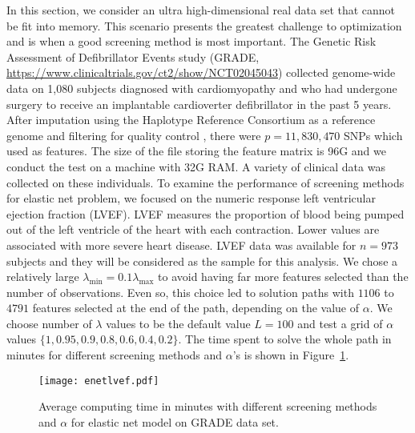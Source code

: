 In this section, we consider an ultra high-dimensional real data set that cannot be fit into memory. This scenario presents the greatest challenge to optimization and is when a good screening method is most important. The Genetic Risk Assessment of Defibrillator Events study (GRADE, \url{https://www.clinicaltrials.gov/ct2/show/NCT02045043}) collected genome-wide data on 1,080 subjects diagnosed with cardiomyopathy and who had undergone surgery to receive an implantable cardioverter defibrillator in the past 5 years. After imputation using the Haplotype Reference Consortium as a reference genome and filtering for quality control \citep{Das2016}, there were $p=11,830,470$ SNPs which used as features. The size of the file storing the feature matrix is 96G and we conduct the test on a machine with 32G RAM. A variety of clinical data was collected on these individuals. To examine the performance of screening methods for elastic net problem, we focused on the numeric response left ventricular ejection fraction (LVEF). LVEF measures the proportion of blood being pumped out of the left ventricle of the heart with each contraction. Lower values are associated with more severe heart disease. LVEF data was available for $n=973$ subjects and they will be considered as the sample for this analysis. We chose a relatively large $\lambda_{\min} =0.1\lambda_{\max}$ to avoid having far more features selected than the number of observations. Even so, this choice led to solution paths with $1106$ to $4791$ features selected at the end of the path, depending on the value of $\alpha$. We choose number of $\lambda$ values to be the default value $L=100$ and test a grid of $\alpha$ values $\{1,0.95,0.9,0.8,0.6,0.4,0.2\}$. The time spent to solve the whole path in minutes for different screening methods and $\alpha$'s is shown in Figure~\ref{fig:lvef}. 

\begin{figure}[ht]
    \centering
    \texttt{[image: enetlvef.pdf]}    \caption[Comparison of screening methods for elastic net on LVEF analysis by $\alpha$]{Average computing time in minutes with different screening methods and $\alpha$ for elastic net model on GRADE data set.}
    \label{fig:lvef}
\end{figure}

